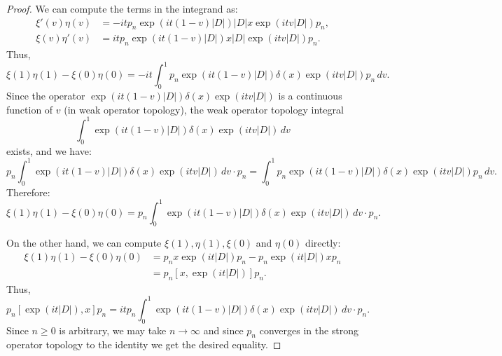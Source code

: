 \begin{proof}
        We can compute the terms in the integrand as:
        \begin{align*}
            \xi'(v)\eta(v) &= -itp_n\exp(it(1-v)|D|)|D|x\exp(itv|D|)p_n,\\
            \xi(v)\eta'(v) &= itp_n\exp(it(1-v)|D|)x|D|\exp(itv|D|)p_n.
        \end{align*}
        Thus, 
        \begin{equation*}
            \xi(1)\eta(1)-\xi(0)\eta(0) = -it\int_0^1 p_n\exp(it(1-v)|D|)\delta(x)\exp(itv|D|)p_n\,dv. 
        \end{equation*}
        Since the operator $\exp(it(1-v)|D|)\delta(x)\exp(itv|D|)$ is a continuous function of $v$ (in weak operator topology), the weak operator
        topology integral
        \begin{equation*}
            \int_{0}^1 \exp(it(1-v)|D|)\delta(x)\exp(itv|D|)\,dv
        \end{equation*}
        exists, and we have:
        \begin{equation*}
            p_n \int_{0}^1 \exp(it(1-v)|D|)\delta(x)\exp(itv|D|)\,dv\cdot p_n = \int_{0}^1 p_n \exp(it(1-v)|D|)\delta(x)\exp(itv|D|)p_n\,dv.
        \end{equation*}
        Therefore:
        \begin{equation*}
            \xi(1)\eta(1)-\xi(0)\eta(0) = p_n\int_{0}^1 \exp(it(1-v)|D|)\delta(x)\exp(itv|D|)\,dv\cdot p_n.
        \end{equation*}
        
        On the other hand, we can compute $\xi(1), \eta(1), \xi(0)$ and $\eta(0)$ directly:
        \begin{align*}
            \xi(1)\eta(1)-\xi(0)\eta(0) &= p_nx\exp(it|D|)p_n-p_n\exp(it|D|)xp_n\\
                                        &= p_n[x,\exp(it|D|)]p_n.
        \end{align*}
        Thus,
        \begin{equation*}
            p_n[\exp(it|D|),x]p_n = itp_n\int_0^1 \exp(it(1-v)|D|)\delta(x)\exp(itv|D|)\,dv\cdot p_n.
        \end{equation*}
        Since $n \geq 0$ is arbitrary, we may take $n\to\infty$ and since $p_n$ converges in the strong operator topology to the identity
        we get the desired equality.
    \end{proof}
    
